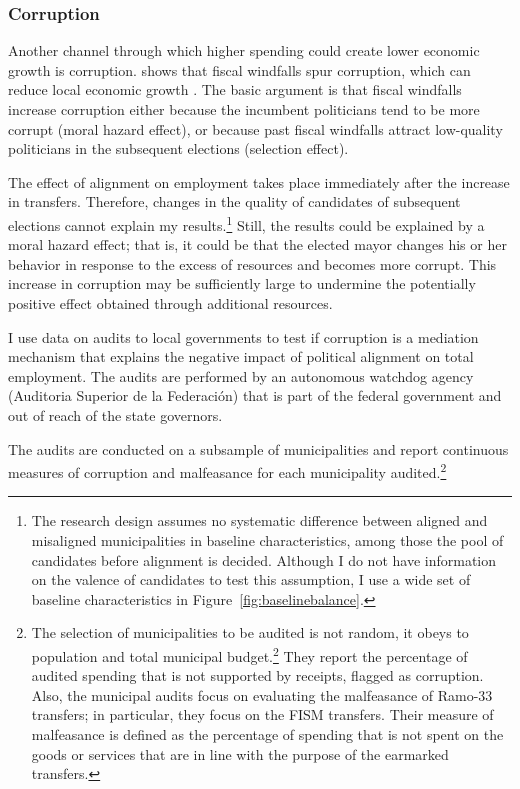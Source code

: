\documentclass[dv_diss_main.tex]{subfiles}
\begin{document}
\subsubsection{Corruption} 
Another channel through which higher spending could create lower economic growth is corruption. \cite{brollo2013political} shows that fiscal windfalls spur corruption, which can reduce local economic growth \cite{colonnelli2020corruption}. The basic argument is that fiscal windfalls increase corruption either because the incumbent politicians tend to be more corrupt (moral hazard effect), or because past fiscal windfalls attract low-quality politicians in the subsequent elections (selection effect). 

The effect of alignment on employment takes place immediately after the increase in transfers. Therefore, changes in the quality of candidates of subsequent elections cannot explain my results.\footnote{ 
The research design assumes no systematic difference between aligned and misaligned municipalities in baseline characteristics, among those the pool of candidates before alignment is decided. Although I do not have information on the valence of candidates to test this assumption, I use a wide set of baseline characteristics in Figure~\ref{fig:baselinebalance}.} 
Still, the results could be explained by a moral hazard effect; that is, it could be that the elected mayor changes his or her behavior in response to the excess of resources and becomes more corrupt. This increase in corruption may be sufficiently large to undermine the potentially positive effect obtained through additional resources.   

I use data on audits to local governments to test if corruption is a mediation mechanism that explains the negative impact of political alignment on total employment. The audits are performed by an autonomous watchdog agency (Auditoria Superior de la Federación) that is part of the federal government and out of reach of the state governors. 

The audits are conducted on a subsample of municipalities and report continuous measures of corruption and malfeasance for each municipality audited.\footnote{The selection of municipalities to be audited is not random, it obeys to population and total municipal budget.\footnote{ See \cite{arias2018priors} and \cite{chong2015does} for more details} They report the percentage of audited spending that is not supported by receipts,  flagged as corruption. Also, the municipal audits focus on evaluating the malfeasance of Ramo-33 transfers; in particular, they focus on the FISM transfers. Their measure of malfeasance is defined as the percentage of spending that is not spent on the goods or services that are in line with the purpose of the earmarked transfers.}
\end{document}
